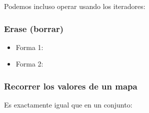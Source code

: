 \documentclass[letterpaper,10pt,spanish]{sphinxmanual}
\begin{document}
Podemos incluso operar usando los iteradores:

\begin{sphinxVerbatim}[commandchars=\\\{\},numbers=left,firstnumber=1,stepnumber=1]
\end{sphinxVerbatim}


\subsubsection{Erase (borrar)}
\label{\detokenize{edd/no_lineales:id3}}\begin{itemize}
\item {} 
Forma 1:

\end{itemize}

\begin{sphinxVerbatim}[commandchars=\\\{\},numbers=left,firstnumber=1,stepnumber=1]
      
\end{sphinxVerbatim}
\begin{itemize}
\item {} 
Forma 2:

\end{itemize}

\begin{sphinxVerbatim}[commandchars=\\\{\},numbers=left,firstnumber=1,stepnumber=1]
\end{sphinxVerbatim}


\subsubsection{Recorrer los valores de un mapa}
\label{\detokenize{edd/no_lineales:recorrer-los-valores-de-un-mapa}}
Es exactamente igual que en un conjunto:
\end{document}
